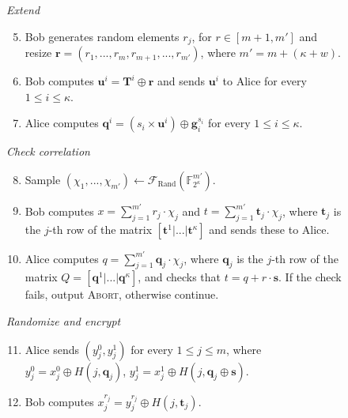 \begin{figure}
\begin{tcolorbox}
    \textit{\hspace{0.25cm} Extend}
    \begin{enumerate}
    \setcounter{enumi}{4}
        \item Bob generates random elements $r_j$, for $r\in [m+1, m']$ and resize $\boldsymbol{r} = (r_1, ..., r_m, r_{m+1}, ..., r_{m'})$, where $m' = m + (\kappa + w)$.
        \item Bob computes $\boldsymbol{u}^i = \boldsymbol{T}^i \oplus \boldsymbol{r}$ and sends $\boldsymbol{u}^i$ to Alice for every $1\leq i\leq \kappa$.
        \item Alice computes $\boldsymbol{q}^i = (s_i \times \boldsymbol{u}^i) \oplus \boldsymbol{g}^{s_i}_i$ for every $1\leq i\leq \kappa$.
    \end{enumerate}
    \textit{\hspace{0.25cm} Check correlation}
    \begin{enumerate}
    \setcounter{enumi}{7}
        \item Sample $(\chi_1, ..., \chi_{m'})\leftarrow \mathcal{F}_{\text{Rand}}(\mathbb{F}^{m'}_{2^\kappa})$.
        \item Bob computes $x = \sum_{j=1}^{m'} r_j \cdot \chi_j$ and $t = \sum_{j=1}^{m'} \boldsymbol{t}_j \cdot \chi_j$, where $\boldsymbol{t}_j$ is the $j$-th row of the matrix $[ \boldsymbol{t}^1 | ...| \boldsymbol{t}^\kappa]$ and sends these to Alice.
        \item Alice computes $q = \sum_{j=1}^{m'} \boldsymbol{q}_j \cdot \chi_j$, where $\boldsymbol{q}_j$ is the $j$-th row of the matrix $Q = [ \boldsymbol{q}^1 | ...| \boldsymbol{q}^\kappa]$, and checks that $t = q + r\cdot \boldsymbol{s}$. If the check fails, output \textsc{Abort}, otherwise continue. %
    \end{enumerate} 
    
    \textit{\hspace{0.25cm} Randomize and encrypt}
    \begin{enumerate}
    \setcounter{enumi}{10}
        \item Alice sends $(y^0_j, y^1_j)$ for every $1\leq j\leq m$, where $y^0_j = x^0_j\oplus H(j,\boldsymbol{q}_j)$, $y^1_j = x^1_j\oplus H(j,\boldsymbol{q}_j\oplus \boldsymbol{s})$. %
        \item Bob computes $x^{r_j}_j = y^{r_j}_j \oplus H(j, \boldsymbol{t}_j)$.
    \end{enumerate} 
    

\end{tcolorbox}
\end{figure}

